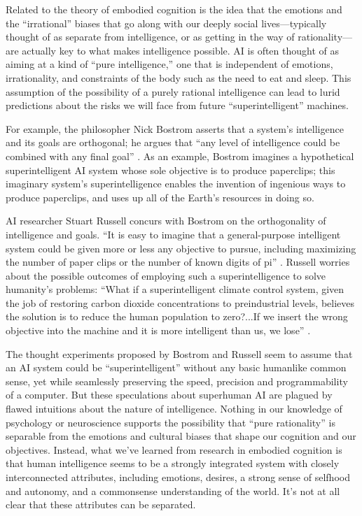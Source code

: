 \documentclass[12pt]{article}
\begin{document}
Related to the theory of embodied cognition is the idea that the emotions and the ``irrational'' biases that go along with our deeply social lives---typically thought of as separate from intelligence, or as getting in the way of rationality---are actually key to what makes intelligence possible.  AI is often thought of as aiming at a kind of ``pure intelligence,'' one that is independent of emotions, irrationality, and constraints of the body such as the need to eat and sleep.  This assumption of the possibility of a purely rational intelligence can lead to lurid predictions about the risks we will face from future ``superintelligent'' machines.  

For example, the philosopher Nick Bostrom asserts that a system's intelligence and its goals are orthogonal; he argues that ``any level of intelligence could be combined with any final goal'' \cite{Bostrom2014}. As an example, Bostrom imagines a hypothetical superintelligent AI system whose sole objective is to produce paperclips; this imaginary system's superintelligence enables the invention of ingenious ways to produce paperclips, and uses up all of the Earth's resources in doing so.   

AI researcher Stuart Russell concurs with Bostrom on the orthogonality of intelligence and goals. ``It is easy to imagine that a general-purpose intelligent system could be given more or less any objective 
to pursue, including maximizing the number of paper clips or the number of known digits of pi''
\cite{Russell2019b}. Russell worries about the possible outcomes of employing such a superintelligence to solve humanity's problems:  ``What if a superintelligent climate control system, given the job of restoring carbon dioxide concentrations to preindustrial levels, believes the solution is to reduce the human population to zero?...If we insert the wrong objective into the machine and it is more intelligent than us, we lose'' \cite{Russell2019c}.

The thought experiments proposed by Bostrom and Russell seem to assume that an AI system could be ``superintelligent'' without any basic humanlike common sense, yet while seamlessly preserving the speed, precision and programmability of a computer.  But these speculations about superhuman AI are plagued by flawed intuitions about the nature of intelligence.  Nothing in our knowledge of psychology or neuroscience supports the possibility that ``pure rationality'' is separable from the emotions and cultural biases that shape our cognition and our objectives.  Instead, what we've learned from research in embodied cognition is that human intelligence seems to be a strongly integrated system with closely interconnected attributes, including emotions, desires, a strong sense of selfhood and autonomy, and a commonsense understanding of the world.  It's not at all clear that these attributes can be separated.
\end{document}
